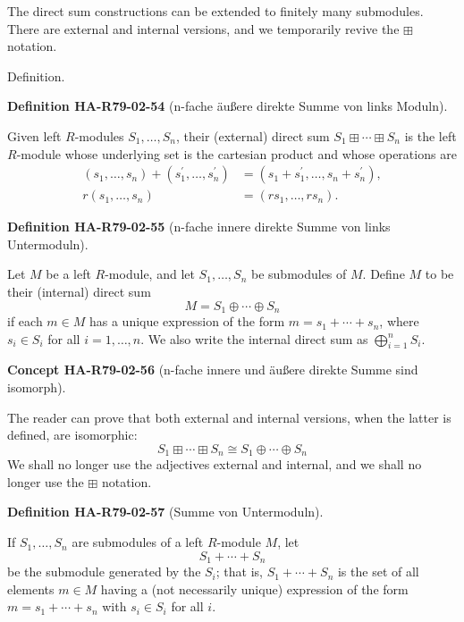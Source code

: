 \documentclass[10pt, letterpaper]{article}
\newcommand{\CustomHeading}[3]{%
  \par\medskip\noindent%
  \textbf{#1 #2} \textnormal{(#3)}.\enskip%
}
\newenvironment{DEF}[2]{\begin{unitbox}\CustomHeading{Definition}{#1}{#2}}{\end{unitbox}}
\newenvironment{CONC}[2]{\begin{unitbox}\CustomHeading{Concept}{#1}{#2}}{\end{unitbox}}
\begin{document}
The direct sum constructions can be extended to finitely many submodules. There are external and internal versions, and we temporarily revive the $\boxplus$ notation.

Definition. 

\begin{DEF}{HA-R79-02-54}{n-fache äußere direkte Summe von links Moduln}
Given left $R$-modules $S_{1}, \ldots, S_{n}$, their (external) direct sum $S_{1} \boxplus \cdots \boxplus S_{n}$ is the left $R$-module whose underlying set is the cartesian product and whose operations are
$$
\begin{aligned}
\left(s_{1}, \ldots, s_{n}\right)+\left(s_{1}^{\prime}, \ldots, s_{n}^{\prime}\right) & =\left(s_{1}+s_{1}^{\prime}, \ldots, s_{n}+s_{n}^{\prime}\right), \\
r\left(s_{1}, \ldots, s_{n}\right) & =\left(r s_{1}, \ldots, r s_{n}\right) .
\end{aligned}
$$
\end{DEF}


\begin{DEF}{HA-R79-02-55}{n-fache innere direkte Summe von links Untermoduln}
Let $M$ be a left $R$-module, and let $S_{1}, \ldots, S_{n}$ be submodules of $M$. Define $M$ to be their (internal) direct sum
$$
M=S_{1} \oplus \cdots \oplus S_{n}
$$
if each $m \in M$ has a unique expression of the form $m=s_{1}+\cdots+s_{n}$, where $s_{i} \in S_{i}$ for all $i=1, \ldots, n$. We also write the internal direct sum as $\bigoplus_{i=1}^{n} S_{i}$.
\end{DEF}



\begin{CONC}{HA-R79-02-56}{n-fache innere und äußere direkte Summe sind isomorph}
The reader can prove that both external and internal versions, when the latter is defined, are isomorphic: 
$$S_{1} \boxplus \cdots \boxplus S_{n} \cong S_{1} \oplus \cdots \oplus S_{n}$$ 
We shall no longer use the adjectives external and internal, and we shall no longer use the $\boxplus$ notation.
\end{CONC}


\begin{DEF}{HA-R79-02-57}{Summe von Untermoduln}
If $S_{1}, \ldots, S_{n}$ are submodules of a left $R$-module $M$, let
$$
S_{1}+\cdots+S_{n}
$$
be the submodule generated by the $S_{i}$; that is, $S_{1}+\cdots+S_{n}$ is the set of all elements $m \in M$ having a (not necessarily unique) expression of the form $m=s_{1}+\cdots+s_{n}$ with $s_{i} \in S_{i}$ for all $i$.
\end{DEF}
\end{document}

